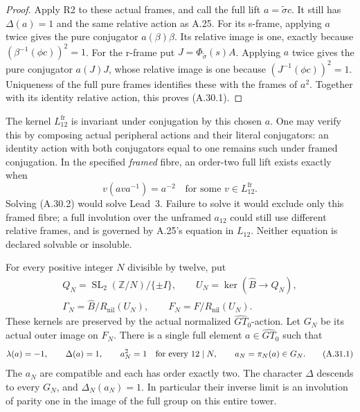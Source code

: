 \begin{proof}
Apply R2 to these actual frames, and call the full
lift \(a=\widetilde\sigma c\). It still has
\(\Delta(a)=1\) and the same relative action as
A.25. For its s-frame, applying \(a\) twice
gives the pure conjugator \(a(\beta)\beta\).
Its relative image is one, exactly because
\((\beta^{-1}(\phi c))^2=1\).
For the r-frame put \(J=\Phi_{\widetilde\sigma}(s)A\).
Applying \(a\) twice gives the pure conjugator
\(a(J)J\), whose relative image is one because
\((J^{-1}(\phi c))^2=1\). Uniqueness of the full
pure frames identifies these with the frames of
\(a^2\). Together with its identity relative
action, this proves (A.30.1).
\end{proof}

The kernel \(L_{12}^{\mathrm{fr}}\) is invariant
under conjugation by this chosen \(a\). One may
verify this by composing actual peripheral actions
and their literal conjugators: an identity action
with both conjugators equal to one remains such
under framed conjugation. In the specified
\emph{framed} fibre, an order-two full lift exists
exactly when
\[
             v(ava^{-1})=a^{-2}
             \quad\text{for some }v\in L_{12}^{\mathrm{fr}}.
 \tag{A.30.2}
\]
Solving (A.30.2) would solve Lead~3. Failure to
solve it would exclude only this framed fibre;
a full involution over the unframed \(a_{12}\)
could still use different relative frames, and
is governed by A.25's equation in \(L_{12}\).
Neither equation is declared solvable or insoluble.

For every positive integer \(N\) divisible by twelve, put
\[
 \begin{gathered}
 Q_N=\operatorname{SL}_2(\mathbb Z/N)/\{\pm I\},\qquad
 U_N=\ker(\widehat B\longrightarrow Q_N),\\
 \Gamma_N=\widehat B/R_{\mathrm{nil}}(U_N),\qquad
 F_N=F/R_{\mathrm{nil}}(U_N).
 \end{gathered}
\]
These kernels are preserved by the actual normalized
\(\widehat{GT}_0\)-action. Let \(G_N\) be its actual outer
image on \(F_N\). There is a single full element
\(a\in\widehat{GT}_0\) such that
\[
 \lambda(a)=-1,\qquad \Delta(a)=1,\qquad
 a_N^2=1\quad\hbox{for every }12\mid N,
 \qquad a_N=\pi_N(a)\in G_N.
 \tag{A.31.1}
\]
The \(a_N\) are compatible and each has order exactly two.
The character \(\Delta\) descends to every \(G_N\), and
\(\Delta_N(a_N)=1\). In particular their inverse limit
is an involution of parity one in the image of the full
group on this entire tower.


